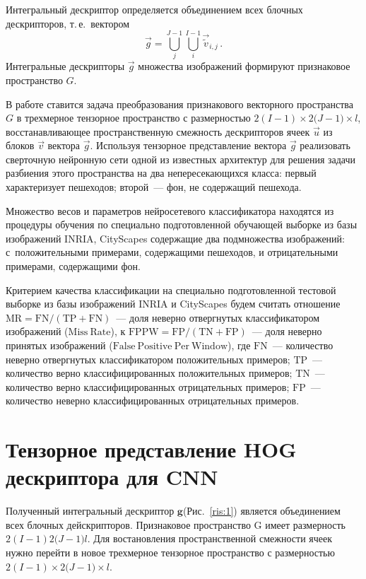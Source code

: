 \documentclass[12pt,twoside]{article}
\begin{document}
Интегральный дескриптор определяется объединением всех
блочных дескрипторов, т.\,е.\ вектором
\begin{equation}
\vec {g}=\bigcup_j^{J-1}{\bigcup_i^{I-1}{\vec{\tilde{v}}_{i,j}}}\,.
\end{equation}
Интегральные дескрипторы $\vec{g}$ множества изображений формируют
признаковое пространство $G$. 

В работе ставится задача преобразования признакового векторного пространства $G$ в трехмерное тензорное пространство с размерностью ${2(I-1)}\times{2(J-1})\times{l}$, восстанавливающее пространственную смежность дескрипторов ячеек $\vec{u}$ из блоков $\vec{v}$ вектора $\vec{g}$. Используя тензорное представление вектора $\vec{g}$ реализовать сверточную нейронную сети одной из известных архитектур для решения задачи разбиения этого пространства
на два непересекающихся класса: первый характеризует пешеходов; второй~--- фон, не содержащий пешехода. 

Множество весов и параметров нейросетевого классификатора находятся из процедуры обучения по специально подготовленной 
обучающей выборке из базы изображений INRIA, CityScapes \cite{inria} содержащие два подмножества изображений: 
с~положительными примерами, содержащими пешеходов, и отрицательными примерами, содержащими фон.

	Критерием качества классификации  на специально
	подготовленной тестовой выборке из базы изображений INRIA \cite{inria} и CityScapes
	будем считать отношение $\mathrm{MR} = \mathrm{FN}/(\mathrm{TP}+\mathrm{FN})$~---
	доля неверно отвергнутых классификатором изображений ($\mathrm{Miss\ Rate}$),
	к $\mathrm{FPPW} = \mathrm{FP}/(\mathrm{TN}+\mathrm{FP})$~---
	доля неверно принятых изображений ($\mathrm{False\ Positive\ Per\
	Window}$), где $\mathrm{FN}$~--- количество неверно отвергнутых
	классификатором положительных примеров; $\mathrm{TP}$~---
	количество верно классифицированных положительных примеров;
	$\mathrm{TN}$~--- количество верно классифицированных отрицательных
	примеров; $\mathrm{FP}$~--- количество неверно классифицированных отрицательных примеров.


\section{Тензорное представление HOG дескриптора для CNN}
Полученный интегральный дескриптор $\textbf{g}$(Рис.~\ref{ris:1}) является объединением всех блочных дейскрипторов. Признаковое пространство G имеет размерность ${2(I-1)}{2(J-1}){l}$. Для востановления пространственной смежности ячеек нужно перейти в новое трехмерное тензорное пространство с размерностью  ${2(I-1)}\times{2(J-1})\times{l}$. \\
\end{document}
